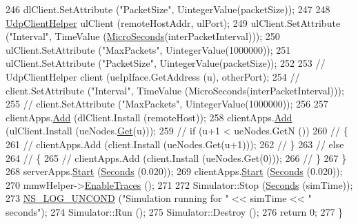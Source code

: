 \begin{DoxyCode}
246         dlClient.SetAttribute (\textcolor{stringliteral}{"PacketSize"}, UintegerValue(packetSize));
247 
248         \hyperlink{classns3_1_1UdpClientHelper}{UdpClientHelper} ulClient (remoteHostAddr, ulPort);
249         ulClient.SetAttribute (\textcolor{stringliteral}{"Interval"}, TimeValue (\hyperlink{group__timecivil_ga17465a639c8d1464e76538afdd78a9f0}{MicroSeconds}(interPacketInterval)));
250         ulClient.SetAttribute (\textcolor{stringliteral}{"MaxPackets"}, UintegerValue(1000000));
251         ulClient.SetAttribute (\textcolor{stringliteral}{"PacketSize"}, UintegerValue(packetSize));
252 
253         \textcolor{comment}{//              UdpClientHelper client (ueIpIface.GetAddress (u), otherPort);}
254         \textcolor{comment}{//              client.SetAttribute ("Interval", TimeValue (MicroSeconds(interPacketInterval)));}
255         \textcolor{comment}{//              client.SetAttribute ("MaxPackets", UintegerValue(1000000));}
256 
257         clientApps.\hyperlink{classns3_1_1ApplicationContainer_ad09ab1a1ad5849d518d5f4c262e38152}{Add} (dlClient.Install (remoteHost));
258         clientApps.\hyperlink{classns3_1_1ApplicationContainer_ad09ab1a1ad5849d518d5f4c262e38152}{Add} (ulClient.Install (ueNodes.\hyperlink{classns3_1_1NodeContainer_a9ed96e2ecc22e0f5a3d4842eb9bf90bf}{Get}(u)));
259         \textcolor{comment}{//              if (u+1 < ueNodes.GetN ())}
260         \textcolor{comment}{//              \{}
261         \textcolor{comment}{//                      clientApps.Add (client.Install (ueNodes.Get(u+1)));}
262         \textcolor{comment}{//              \}}
263         \textcolor{comment}{//              else}
264         \textcolor{comment}{//              \{}
265         \textcolor{comment}{//                      clientApps.Add (client.Install (ueNodes.Get(0)));}
266         \textcolor{comment}{//              \}}
267   \}
268   serverApps.\hyperlink{classns3_1_1ApplicationContainer_a8eff87926507020bbe3e1390358a54a7}{Start} (\hyperlink{group__timecivil_ga33c34b816f8ff6628e33d5c8e9713b9e}{Seconds} (0.020));
269   clientApps.\hyperlink{classns3_1_1ApplicationContainer_a8eff87926507020bbe3e1390358a54a7}{Start} (\hyperlink{group__timecivil_ga33c34b816f8ff6628e33d5c8e9713b9e}{Seconds} (0.020));
270   mmwHelper->\hyperlink{classns3_1_1MmWaveHelper_a4eae3871876b62965d612d9a56ed21bc}{EnableTraces} ();
271 
272   Simulator::Stop (\hyperlink{group__timecivil_ga33c34b816f8ff6628e33d5c8e9713b9e}{Seconds} (simTime));
273         \hyperlink{log-macros-disabled_8h_a0b36e5e182b37194f85ef1c5e979fb2e}{NS\_LOG\_UNCOND} (\textcolor{stringliteral}{"Simulation running for "} << simTime << \textcolor{stringliteral}{" seconds"});
274   Simulator::Run ();
275   Simulator::Destroy ();
276   \textcolor{keywordflow}{return} 0;
277 \}
\end{DoxyCode}


